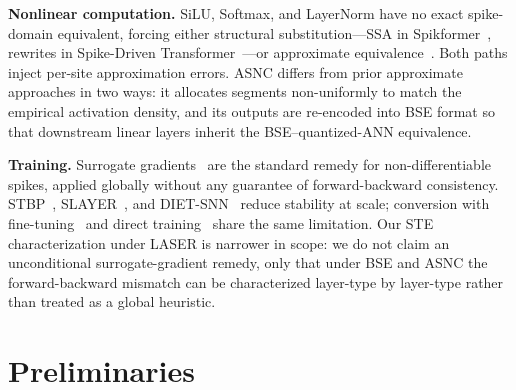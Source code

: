 \documentclass{article}
\theoremstyle{plain}
\theoremstyle{definition}
\theoremstyle{remark}
\begin{document}
\noindent\textbf{Nonlinear computation.}
SiLU, Softmax, and LayerNorm have no exact spike-domain equivalent, forcing
either structural substitution---SSA in Spikformer~\citep{zhou2023spikformer},
rewrites in Spike-Driven
Transformer~\citep{yao2023sdt,spikedattention2024,wang2023stsa}---or
approximate equivalence~\citep{you2024spikeziptf,tang2024sorbet,zhu2023spikegpt,
xing2025spikellm}. Both paths inject per-site approximation errors. ASNC
differs from prior approximate approaches in two ways: it allocates segments
non-uniformly to match the empirical activation density, and its outputs are
re-encoded into BSE format so that downstream linear layers inherit the
BSE--quantized-ANN equivalence.

\noindent\textbf{Training.}
Surrogate gradients~\citep{neftci2019surrogate,wu2018stbp,shrestha2018slayer}
are the standard remedy for non-differentiable spikes, applied globally without
any guarantee of forward-backward consistency.
STBP~\citep{wu2018stbp}, SLAYER~\citep{shrestha2018slayer}, and
DIET-SNN~\citep{rathi2021dietsnn} reduce stability at scale; conversion with
fine-tuning~\citep{rathi2020hybrid} and direct training~\citep{xing2024spikelm}
share the same limitation. Our STE characterization under LASER is narrower in
scope: we do not claim an unconditional surrogate-gradient remedy, only that
under BSE and ASNC the forward-backward mismatch can be characterized
layer-type by layer-type rather than treated as a global heuristic.



\section{Preliminaries}
\label{sec:preliminaries}
\end{document}

